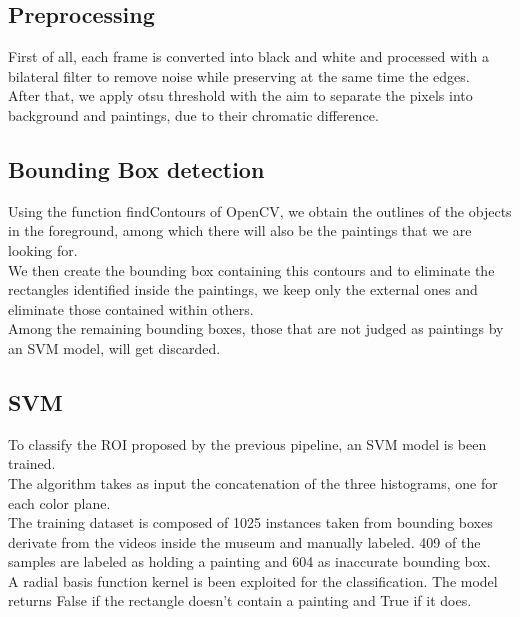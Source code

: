 \documentclass[conference]{IEEEtran}
\begin{document}
\subsection{Preprocessing}
First of all, each frame is converted into black and white and processed with a bilateral filter to remove noise while preserving at the same time the edges.\\
After that, we apply otsu threshold  with the aim to separate the pixels into background and paintings, due to their chromatic difference.

\subsection{Bounding Box detection}
Using the function findContours of OpenCV, we obtain the outlines of the objects in the foreground, among which there will also be the paintings that we are looking for.\\
We then create the bounding box containing this contours and to eliminate the rectangles identified inside the paintings, we keep only the external ones and eliminate those contained within others.\\
Among the remaining bounding boxes, those that are not judged as paintings by an SVM model, will get discarded.

\subsection{SVM}
To classify the ROI proposed by the previous pipeline, an SVM model is been trained.\\
The algorithm takes as input the concatenation of the three histograms, one for each color plane.\\
The training dataset is composed of 1025 instances taken from bounding boxes derivate from the videos inside the museum and manually labeled.
409 of the samples are labeled as holding a painting and 604 as inaccurate bounding box.\\
A radial basis function kernel is been exploited for the classification.
The model returns False if the rectangle doesn't contain a painting and True if it does.
\end{document}
